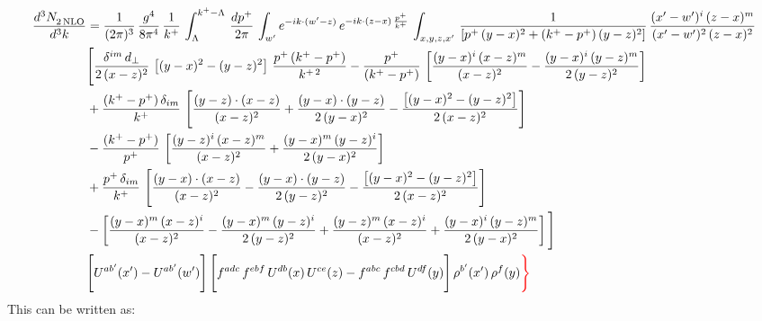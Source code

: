 \documentclass[9pt]{article}
\numberwithin{equation}{section}
\begin{document}
\begin{align}
    \frac{d^{3}N_{2\,\rm NLO}^{\rm}}{d^{3}k}  & =  \frac{1}{(2\pi)^{3}}\,\frac{g^{4}}{8\pi^{4}}\,\frac{1}{k^{+}}\,\int_{\Lambda}^{k^{+}-\Lambda}\, \frac{dp^{+}}{2\pi} \,\int_{ w^\prime} e^{-ik\cdot(w'-z)}\,e^{-ik\cdot (z-x)\,\frac{p^{+}}{k^{+}}}\, \int_{x,y,z,x'}\,\frac{1}{\left[p^{+}\,(y-x)^{2}+(k^{+}-p^{+})\,(y-z)^{2}\right]}\, \frac{(x'-w')^{i}\,(z-x)^{m}}{(x'-w')^{2}\,(z-x)^{2}} \notag \\ & \Bigg[\frac{\delta^{im}\,d_{\perp}}{2\,(x-z)^{2}}\,\left[(y-x)^{2}-(y-z)^{2}\right]\,\frac{p^{+}\,(k^{+}-p^{+})}{k^{+\,2}}-\frac{p^{+}}{(k^{+}-p^{+})}\,\left[\frac{(y-x)^{i}\,(x-z)^{m}}{(x-z)^{2}}-\frac{(y-x)^{i}\,(y-z)^{m}}{2\,(y-z)^{2}}\right]\notag \\ & +\frac{(k^{+}-p^{+})\,\delta_{im}}{k^{+}}\,\left[\frac{(y-z)\cdot (x-z)}{(x-z)^{2}}+\frac{(y-x)\cdot (y-z)}{2\,(y-x)^{2}}-\frac{\left[(y-x)^{2}-(y-z)^{2}\right]}{2\,(x-z)^{2}}\right]\notag \\ & -\frac{(k^{+}-p^{+})}{p^{+}}\,\left[\frac{(y-z)^{i}\,(x-z)^{m}}{(x-z)^{2}}+\frac{(y-x)^{m}\,(y-z)^{i}}{2\,(y-x)^{2}}\right]\notag \\ & +\frac{p^{+}\,\delta_{im}}{k^{+}}\,\left[\frac{(y-x)\cdot (x-z)}{(x-z)^{2}}-\frac{(y-x)\cdot (y-z)}{2\,(y-z)^{2}}-\frac{\left[(y-x)^{2}-(y-z)^{2}\right]}{2\,(x-z)^{2}}\right]\notag \\ &-\left[\frac{(y-x)^{m}\,(x-z)^{i}}{(x-z)^{2}}-\frac{(y-x)^{m}\,(y-z)^{i}}{2\,(y-z)^{2}}+\frac{(y-z)^{m}\,(x-z)^{i}}{(x-z)^{2}}+\frac{(y-x)^{i}\,(y-z)^{m}}{2\,(y-x)^{2}}\right]\Bigg] \notag \\ & \Bigg[U^{ab'}(x')-U^{ab'}(w')\Bigg]\,\Bigg[f^{adc}\,f^{ebf}\,U^{db}(x)\,U^{ce}(z)-f^{abc}\,f^{cbd}\,U^{df}(y)\Bigg]\,\rho^{b'}(x')\,\rho^{f}(y){\color{red}\Bigg\}}
\end{align}
This can be written as: 
\end{document}
